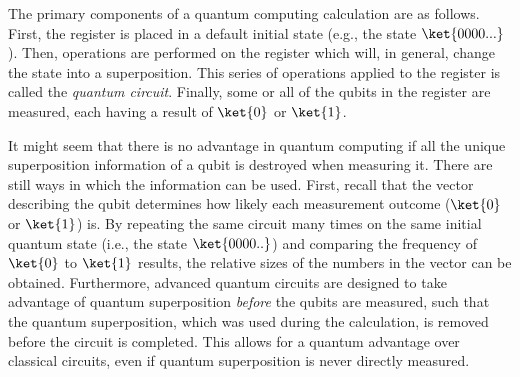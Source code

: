\documentclass[%
 reprint,
nofootinbib,
 amsmath,amssymb,
 aps,
]{revtex4-2}
\begin{document}
The primary components of a quantum computing calculation are as follows. First, the register is placed in a default initial state (e.g., the state $\ket{0000...}$). Then, operations are performed on the register which will, in general, change the state into a superposition. This series of operations applied to the register is called the \textit{quantum circuit}. Finally, some or all of the qubits in the register are measured, each having a result of $\ket{0}$ or $\ket{1}$. 

It might seem that there is no advantage in quantum computing if all the unique superposition information of a qubit is destroyed when measuring it. There are still ways in which the information can be used. First, recall that the vector describing the qubit determines how likely each measurement outcome ($\ket{0}$ or $\ket{1}$) is. By repeating the same circuit many times on the same initial quantum state (i.e., the state $\ket{0000..}$) and comparing the frequency of $\ket{0}$ to $\ket{1}$ results, the relative sizes of the numbers in the vector can be obtained. Furthermore, advanced quantum circuits are designed to take advantage of quantum superposition \textit{before} the qubits are measured, such that the quantum superposition, which was used during the calculation, is removed before the circuit is completed. This allows for a quantum advantage over classical circuits, even if quantum superposition is never directly measured.

\end{document}
